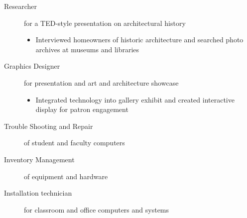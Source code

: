 \documentclass[a4paper]{deedy-resume} %
\begin{document}
    \begin{description}
    \item[Researcher] for a TED-style presentation on architectural history 
    
    \iftrue

    \begin{itemize}
        \item Interviewed homeowners of historic architecture and searched photo archives at museums and libraries
    \end{itemize}

    \fi

    \item[Graphics Designer] for presentation and art and architecture showcase
    \iftrue

    \begin{itemize}
        \item Integrated technology into gallery exhibit and created interactive display for patron engagement
    \end{itemize}

    \fi
    \end{description}
    \fi
    
    
    \iftrue

    \begin{description}
        \item[Trouble Shooting and Repair] of student and faculty computers 
        \item[Inventory Management] of equipment and hardware
        \item[Installation technician] for classroom and office computers and systems 
    \end{description}
    \fi




    \iftrue
\end{document}
